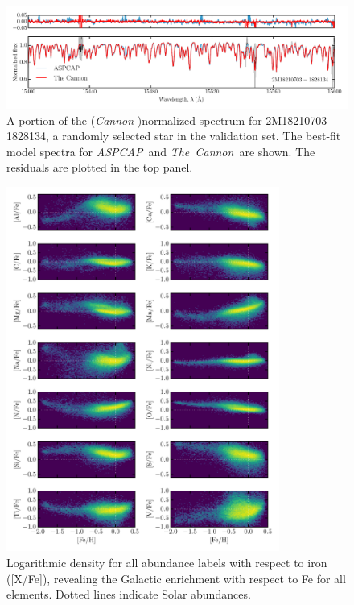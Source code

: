 \documentclass[12pt,preprint]{aastex}
\newcommand{\project}[1]{\textsl{#1}}
\newcommand{\TheCannon}{\project{The~Cannon}}
\newcommand{\acronym}[1]{{\small{#1}}}
\newcommand{\aspcap}{\project{\acronym{ASPCAP}}}
\begin{document}
\clearpage

\begin{figure}[p]
\centering
\includegraphics[width=\textwidth]{spectrum.pdf}
\caption{A portion of the (\emph{Cannon}-)normalized spectrum for 2M18210703-1828134,
a randomly selected star in the validation set.  The best-fit model spectra
for \aspcap\ and \TheCannon\ are shown. The residuals are plotted in the top panel.\label{fig:correctness}}
\end{figure}

\clearpage

\begin{figure}[p]
\centering
\includegraphics[width=0.8\textwidth]{test-step-gce.pdf}
\caption{Logarithmic density for all abundance labels with respect to iron ([X/Fe]), revealing the Galactic  enrichment with respect to Fe for all elements. Dotted lines indicate Solar abundances.\label{fig:gce}}
\end{figure}
\end{document}
